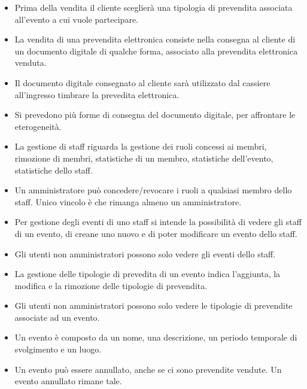 \documentclass[a4paper]{article}
\begin{document}
\begin{itemize}
	\item Prima della vendita il cliente sceglierà una tipologia di prevendita associata all'evento a cui vuole partecipare.
	
	\item La vendita di una prevendita elettronica consiste nella consegna al cliente di un documento digitale di qualche forma, associato alla prevendita elettronica venduta.
	\item Il documento digitale consegnato al cliente sarà utilizzato dal cassiere all'ingresso timbrare la prevedita elettronica.
	
	\item Si prevedono più forme di consegna del documento digitale, per affrontare le eterogeneità.
	
	\item La gestione di staff riguarda la gestione dei ruoli concessi ai membri, rimozione di membri, statistiche di un membro, statistiche dell'evento, statistiche dello staff.
	
	\item Un amministratore può concedere/revocare i ruoli a qualsiasi membro dello staff. Unico vincolo è che rimanga almeno un amministratore.
	   
	\item Per gestione degli eventi di uno staff si intende la possibilità di vedere gli staff di un evento, di creane uno nuovo e di poter modificare un evento dello staff.
	
	\item Gli utenti non amministratori possono solo vedere gli eventi dello staff.
	
	\item La gestione delle tipologie di prevedita di un evento indica l'aggiunta, la modifica e la rimozione delle tipologie di prevendita.
	
	\item Gli utenti non amministratori possono solo vedere le tipologie di prevendite associate ad un evento.
	
	\item Un evento è composto da un nome, una descrizione, un periodo temporale di svolgimento e un luogo. 
	
	\item Un evento può essere annullato, anche se ci sono prevendite vendute. Un evento annullato rimane tale.
	

\end{itemize}
\end{document}
